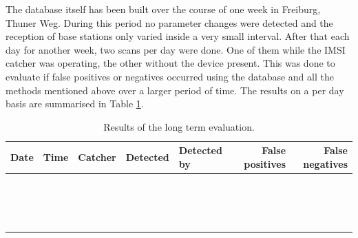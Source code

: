 The database itself has been built over the course of one week in Freiburg, Thuner Weg.
During this period no parameter changes were detected and the reception of base stations only varied inside a very small interval.
After that each day for another week, two scans per day were done.
One of them while the IMSI catcher was operating, the other without the device present.
This was done to evaluate if false positives or negatives occurred using the database and all the methods mentioned above over a larger period of time.
The results on a per day basis are summarised in Table \ref{tab:longterm_test}.
\begin{table}
\centering
\begin{tabular}{lllllrr}
\toprule
Date	&Time	&Catcher	&Detected	&Detected by	&False positives	&False negatives\\
\midrule
		&		&			&			&				&					&				\\
		&		&			&			&				&					&				\\
		&		&			&			&				&					&				\\
		&		&			&			&				&					&				\\
		&		&			&			&				&					&				\\
		&		&			&			&				&					&				\\
		&		&			&			&				&					&				\\
		&		&			&			&				&					&				\\
		&		&			&			&				&					&				\\
		&		&			&			&				&					&				\\
		&		&			&			&				&					&				\\
		&		&			&			&				&					&				\\
		&		&			&			&				&					&				\\
		&		&			&			&				&					&				\\
		&		&			&			&				&					&				\\
		&		&			&			&				&					&				\\
\bottomrule
\end{tabular}
\caption{Results of the long term evaluation.}
\label{tab:longterm_test}
\end{table}

